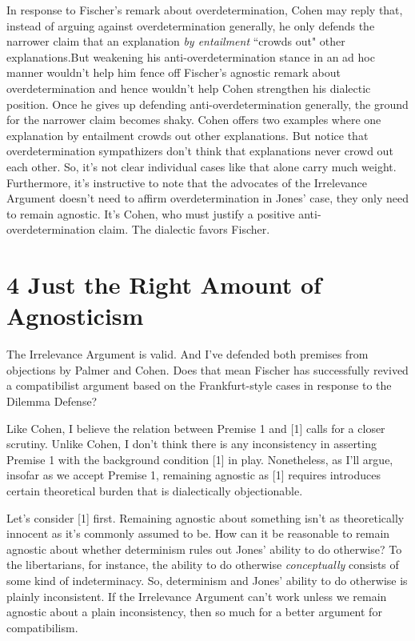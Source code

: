 \documentclass[a4paper,12pt]{article}
\begin{document}
In response to Fischer's remark about overdetermination, Cohen may reply that, instead of arguing against overdetermination generally, he only defends the narrower claim that an explanation \emph{by entailment} ``crowds out" other explanations.\footnotemark But weakening his anti-overdetermination stance in an ad hoc manner wouldn't help him fence off Fischer's agnostic remark about overdetermination and hence wouldn't help Cohen strengthen his dialectic position. Once he gives up defending anti-overdetermination generally, the ground for the narrower claim becomes shaky. Cohen offers two examples where one explanation by entailment crowds out other explanations. But notice that overdetermination sympathizers don't think that explanations never crowd out each other. So, it's not clear individual cases like that alone carry much weight. Furthermore, it's instructive to note that the advocates of the Irrelevance Argument doesn't need to affirm overdetermination in Jones' case, they only need to remain agnostic. It's Cohen, who must justify a positive anti-overdetermination claim. The dialectic favors Fischer.


\section*{4 Just the Right Amount of Agnosticism}

The Irrelevance Argument is valid. And I've defended both premises from objections by Palmer and Cohen. Does that mean Fischer has successfully revived a compatibilist argument based on the Frankfurt-style cases in response to the Dilemma Defense?

Like Cohen, I believe the relation between Premise 1 and [1] calls for a closer scrutiny. Unlike Cohen, I don't think there is any inconsistency in asserting Premise 1 with the background condition [1] in play. Nonetheless, as I'll argue, insofar as we accept Premise 1, remaining agnostic as [1] requires introduces certain theoretical burden that is dialectically objectionable.

Let's consider [1] first. Remaining agnostic about something isn't as theoretically innocent as it's commonly assumed to be. How can it be reasonable to remain agnostic about whether determinism rules out Jones' ability to do otherwise? To the libertarians, for instance, the ability to do otherwise \emph{conceptually} consists of some kind of indeterminacy. So, determinism and Jones' ability to do otherwise is plainly inconsistent. If the Irrelevance Argument can't work unless we remain agnostic about a plain inconsistency, then so much for a better argument for compatibilism.
\end{document}
